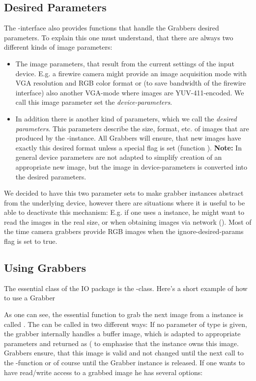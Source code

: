 \subsection{Desired Parameters}
The -interface  also provides functions that handle the Grabbers desired parameters. To explain this one must understand, that there are always two different kinds of image parameters:
\begin{itemize}
\item The image parameters, that result from the current settings of the input device. E.g. a firewire camera might provide an image acquisition mode with VGA resolution and RGB color format or (to save bandwidth of the firewire interface) also another VGA-mode where images are YUV-411-encoded. We call this image parameter set the \emph{device-parameters}.
\item In addition there is another kind of parameters, which we call the \emph{desired parameters}. This parameters describe the size, format, etc. of images that are produced by the -instance. All Grabbers will ensure, that new images have exactly this desired format unless a special flag is set (function ). \textbf{Note:} In general device parameters are not adapted to simplify creation of an appropriate new image, but the image in device-parameters is converted into the desired parameters.
\end{itemize}
We decided to have this two parameter sets to make grabber instances abstract from the underlying device, however there are situations where it is useful to be able to deactivate this mechanism: E.g. if one uses a  instance, he might want to read the images in the real size, or when obtaining images via network (). Most of the time camera grabbers provide RGB images when the ignore-desired-params flag is set to true.

\subsection{Using Grabbers}

The essential class of the IO package is the -class. Here's a short example of how to use a Grabber


As one can see, the essential function to grab the next image from a  instance is called . The  can be called  in two different ways: If no parameter of type  is given, the grabber internally handles a buffer image, which is adapted to appropriate parameters and returned as  ( to emphasise that the  instance owns this image. Grabbers ensure, that this image is valid and not changed until the next call to the -function or of course until the Grabber instance is released. If one wants to have read/write access to a grabbed image he has several options:

